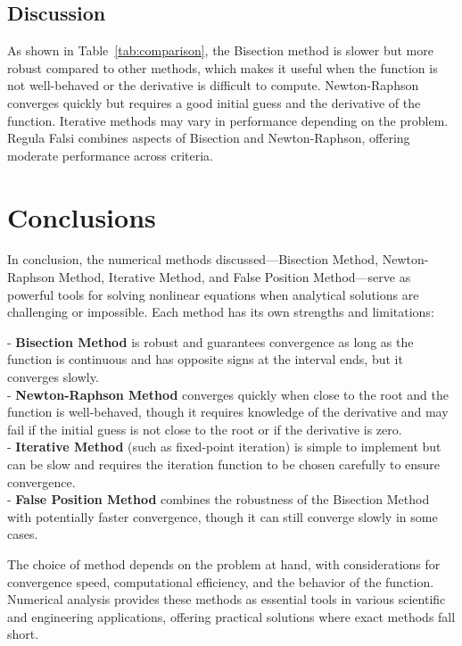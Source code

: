\documentclass[12pt,a4paper]{article}
\begin{document}
		
		
		\subsection{Discussion}
		As shown in Table~\ref{tab:comparison}, the Bisection method is slower but more robust compared to other methods, which makes it useful when the function is not well-behaved or the derivative is difficult to compute. Newton-Raphson converges quickly but requires a good initial guess and the derivative of the function. Iterative methods may vary in performance depending on the problem. Regula Falsi combines aspects of Bisection and Newton-Raphson, offering moderate performance across criteria.
		
	
	
	\clearpage
	\newpage
    \section{ Conclusions}

In conclusion, the numerical methods discussed—Bisection Method, Newton-Raphson Method, Iterative Method, and False Position Method—serve as powerful tools for solving nonlinear equations when analytical solutions are challenging or impossible. Each method has its own strengths and limitations:

- \textbf{Bisection Method} is robust and guarantees convergence as long as the function is continuous and has opposite signs at the interval ends, but it converges slowly. \\
- \textbf{Newton-Raphson Method} converges quickly when close to the root and the function is well-behaved, though it requires knowledge of the derivative and may fail if the initial guess is not close to the root or if the derivative is zero. \\
- \textbf{Iterative Method} (such as fixed-point iteration) is simple to implement but can be slow and requires the iteration function to be chosen carefully to ensure convergence. \\
- \textbf{False Position Method} combines the robustness of the Bisection Method with potentially faster convergence, though it can still converge slowly in some cases.

The choice of method depends on the problem at hand, with considerations for convergence speed, computational efficiency, and the behavior of the function. Numerical analysis provides these methods as essential tools in various scientific and engineering applications, offering practical solutions where exact methods fall short.
	
\end{document}
